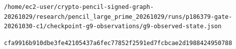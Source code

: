 \documentclass[10pt]{article}
\begin{document}
\texttt{\small /\allowbreak{}h\allowbreak{}o\allowbreak{}m\allowbreak{}e\allowbreak{}/\allowbreak{}e\allowbreak{}c\allowbreak{}2\allowbreak{}-\allowbreak{}u\allowbreak{}s\allowbreak{}e\allowbreak{}r\allowbreak{}/\allowbreak{}c\allowbreak{}r\allowbreak{}y\allowbreak{}p\allowbreak{}t\allowbreak{}o\allowbreak{}-\allowbreak{}p\allowbreak{}e\allowbreak{}n\allowbreak{}c\allowbreak{}i\allowbreak{}l\allowbreak{}-\allowbreak{}s\allowbreak{}i\allowbreak{}g\allowbreak{}n\allowbreak{}e\allowbreak{}d\allowbreak{}-\allowbreak{}g\allowbreak{}r\allowbreak{}a\allowbreak{}p\allowbreak{}h\allowbreak{}-\allowbreak{}2\allowbreak{}0\allowbreak{}2\allowbreak{}6\allowbreak{}1\allowbreak{}0\allowbreak{}2\allowbreak{}9\allowbreak{}/\allowbreak{}r\allowbreak{}e\allowbreak{}s\allowbreak{}e\allowbreak{}a\allowbreak{}r\allowbreak{}c\allowbreak{}h\allowbreak{}/\allowbreak{}p\allowbreak{}e\allowbreak{}n\allowbreak{}c\allowbreak{}i\allowbreak{}l\allowbreak{}\_\allowbreak{}l\allowbreak{}a\allowbreak{}r\allowbreak{}g\allowbreak{}e\allowbreak{}\_\allowbreak{}p\allowbreak{}r\allowbreak{}i\allowbreak{}m\allowbreak{}e\allowbreak{}\_\allowbreak{}2\allowbreak{}0\allowbreak{}2\allowbreak{}6\allowbreak{}1\allowbreak{}0\allowbreak{}2\allowbreak{}9\allowbreak{}/\allowbreak{}r\allowbreak{}u\allowbreak{}n\allowbreak{}s\allowbreak{}/\allowbreak{}p\allowbreak{}1\allowbreak{}8\allowbreak{}6\allowbreak{}3\allowbreak{}7\allowbreak{}9\allowbreak{}-\allowbreak{}g\allowbreak{}a\allowbreak{}t\allowbreak{}e\allowbreak{}-\allowbreak{}2\allowbreak{}0\allowbreak{}2\allowbreak{}6\allowbreak{}1\allowbreak{}0\allowbreak{}3\allowbreak{}0\allowbreak{}-\allowbreak{}c\allowbreak{}1\allowbreak{}/\allowbreak{}c\allowbreak{}h\allowbreak{}e\allowbreak{}c\allowbreak{}k\allowbreak{}p\allowbreak{}o\allowbreak{}i\allowbreak{}n\allowbreak{}t\allowbreak{}-\allowbreak{}g\allowbreak{}9\allowbreak{}-\allowbreak{}o\allowbreak{}b\allowbreak{}s\allowbreak{}e\allowbreak{}r\allowbreak{}v\allowbreak{}a\allowbreak{}t\allowbreak{}i\allowbreak{}o\allowbreak{}n\allowbreak{}s\allowbreak{}/\allowbreak{}g\allowbreak{}9\allowbreak{}-\allowbreak{}o\allowbreak{}b\allowbreak{}s\allowbreak{}e\allowbreak{}r\allowbreak{}v\allowbreak{}e\allowbreak{}d\allowbreak{}-\allowbreak{}s\allowbreak{}t\allowbreak{}a\allowbreak{}t\allowbreak{}e\allowbreak{}.\allowbreak{}j\allowbreak{}s\allowbreak{}o\allowbreak{}n\allowbreak{}}\par\texttt{\small c\allowbreak{}f\allowbreak{}a\allowbreak{}9\allowbreak{}9\allowbreak{}1\allowbreak{}6\allowbreak{}b\allowbreak{}9\allowbreak{}1\allowbreak{}0\allowbreak{}d\allowbreak{}b\allowbreak{}e\allowbreak{}3\allowbreak{}f\allowbreak{}e\allowbreak{}4\allowbreak{}2\allowbreak{}1\allowbreak{}0\allowbreak{}5\allowbreak{}4\allowbreak{}3\allowbreak{}7\allowbreak{}a\allowbreak{}6\allowbreak{}f\allowbreak{}e\allowbreak{}c\allowbreak{}7\allowbreak{}7\allowbreak{}8\allowbreak{}5\allowbreak{}2\allowbreak{}f\allowbreak{}2\allowbreak{}5\allowbreak{}9\allowbreak{}1\allowbreak{}e\allowbreak{}d\allowbreak{}7\allowbreak{}f\allowbreak{}c\allowbreak{}b\allowbreak{}c\allowbreak{}a\allowbreak{}e\allowbreak{}2\allowbreak{}d\allowbreak{}1\allowbreak{}9\allowbreak{}8\allowbreak{}8\allowbreak{}4\allowbreak{}2\allowbreak{}4\allowbreak{}9\allowbreak{}5\allowbreak{}0\allowbreak{}7\allowbreak{}8\allowbreak{}8\allowbreak{}}\par
\end{document}
